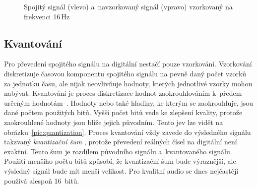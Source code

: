 \begin{figure}[hbt]
    \centering
    \begin{subfigure}[b]{0.5\linewidth}
        \centering
    \end{subfigure}%
    \begin{subfigure}[b]{0.5\linewidth}
        \centering
    \end{subfigure}
    \caption{Spojitý signál (vlevo) a~navzorkovaný signál (vpravo) vzorkovaný
    na frekvenci 16\,Hz}
    \label{pic:continuous-vs-sampled-signal}
\end{figure}

\subsection*{Kvantování}
\label{sub:quantization}

Pro převedení spojitého signálu na digitální nestačí pouze vzorkování.
Vzorkování diskretizuje časovou komponentu spojitého signálu na pevně daný
počet vzorků za jednotku času, ale nijak neovlivňuje hodnoty, kterých
jednotlivé vzorky mohou nabývat. Kvantování je proces diskretizace hodnot
zaokrouhlováním k~předem určeným hodnotám~\cite{Oliver1948}. Hodnoty nebo také
hladiny, ke kterým se zaokrouhluje, jsou dané počtem použitých bitů. Vyšší
počet bitů vede ke zlepšení kvality, protože zaokrouhlené hodnoty jsou blíže
jejich původním. Tento jev lze vidět na obrázku~\ref{pic:quantization}. Proces
kvantování vždy zavede do výsledného signálu takzvaný \textit{kvantizační šum}
\cite{Oliver1948}, protože převedení reálných čísel na digitální není exaktní.
Tento šum je rozdílem původního signálu a~kvantovaného signálu. Použití menšího
počtu bitů způsobí, že kvantizační šum bude výraznější, ale výsledný signál
bude mít menší velikost. Pro kvalitní audio se dnes nejčastěji používá alespoň
16~bitů.

